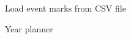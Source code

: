 \bigskip

\begin{extrafullwidth}

\hfill
\begin{minipage}{0.31\linewidth}
\centering

Load event marks from CSV file

\bigskip


\end{minipage}%
\begin{minipage}{0.31\linewidth}
\centering

Year planner


\end{minipage}
\end{extrafullwidth}

